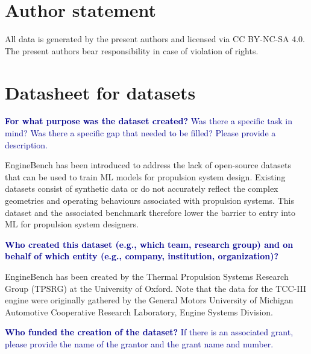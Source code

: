 \documentclass{article}
\begin{document}
\section{Author statement}
All data is generated by the present authors and licensed via CC BY-NC-SA 4.0. The present authors bear responsibility in case of violation of rights.


\newcommand{\dssectionheader}[1]{%
   \noindent\framebox[\columnwidth]{%
      {\fontfamily{phv}\selectfont \textbf{\textcolor{darkblue}{#1}}}
   }
}

\newcommand{\dsquestion}[1]{%
    {\noindent \fontfamily{phv}\selectfont \textcolor{darkblue}{\textbf{#1}}}
}

\newcommand{\dsquestionex}[2]{%
    {\noindent \fontfamily{phv}\selectfont \textcolor{darkblue}{\textbf{#1} #2}}
}

\newcommand{\dsanswer}[1]{%
   {\noindent #1 \medskip}
}

\section{Datasheet for datasets}

\dssectionheader{Motivation}

\dsquestionex{For what purpose was the dataset created?}{Was there a specific task in mind? Was there a specific gap that needed to be filled? Please provide a description.}

\dsanswer{EngineBench has been introduced to address the lack of open-source datasets that can be used to train ML models for propulsion system design. Existing datasets consist of synthetic data or do not accurately reflect the complex geometries and operating behaviours associated with propulsion systems. This dataset and the associated benchmark therefore lower the barrier to entry into ML for propulsion system designers.
}

\dsquestion{Who created this dataset (e.g., which team, research group) and on behalf of which entity (e.g., company, institution, organization)?}

\dsanswer{EngineBench has been created by the Thermal Propulsion Systems Research Group (TPSRG) at the University of Oxford. Note that the data for the TCC-III engine were originally gathered by the General Motors University of
Michigan Automotive Cooperative Research Laboratory, Engine Systems Division.
}

\dsquestionex{Who funded the creation of the dataset?}{If there is an associated grant, please provide the name of the grantor and the grant name and number.}
\end{document}
